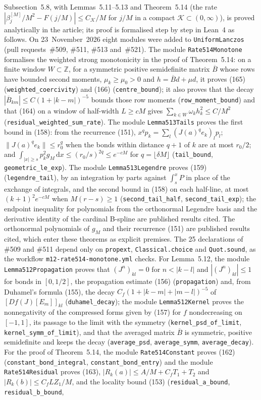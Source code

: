 \documentclass[11pt,a4paper]{article}
\newcommand{\eq}[1]{(#1)}
\begin{document}
Subsection~5.8, with Lemmas~5.11--5.13 and Theorem~5.14 (the rate $|\beta_j^{[M]}/M^2-F(j/M)|\leq C_{\mathcal K}/M$ for $j/M$ in a compact $\mathcal K\subset(0,\infty)$), is proved analytically in the article; its proof is formalised step by step in Lean~4 as follows. On 23~November~2026 eight modules were added to \texttt{UniformLanczos} (pull requests~\#509, \#511, \#513 and~\#521). The module \texttt{Rate514Monotone} formalises the weighted strong monotonicity in the proof of Theorem~5.14: on a finite window $W\subset\mathbb Z$, for a symmetric positive semidefinite matrix $\overline B$ whose rows have bounded second moments, $\mu_k\geq\mu_0>0$ and $h=\overline Bd+\mu d$, it proves \eq{165} (\texttt{weighted\_coercivity}) and \eq{166} (\texttt{centre\_bound}); it also proves that the decay $|\overline B_{km}|\leq C(1+|k-m|)^{-5}$ bounds those row moments (\texttt{row\_moment\_bound}) and that \eq{164} on a window of half-width $L\geq cM$ gives $\sum_{k\in W}\omega_kh_k^2\leq C/M^2$ (\texttt{residual\_weighted\_sum\_rate}). The module \texttt{Lemma513Tails} proves the first bound in \eq{158}: from the recurrence \eq{151}, $x^qp_k=\sum_l(J(a)^qe_k)_lp_l$; $\|J(a)^qe_k\|\leq r_0^q$ when the bonds within distance $q+1$ of $k$ are at most $r_0/2$; and $\int_{|x|\geq s}p_k^2g_M\,\mathrm dx\leq(r_0/s)^{2q}\leq e^{-cM}$ for $q=\lfloor\delta M\rfloor$ (\texttt{tail\_bound}, \texttt{geometric\_le\_exp}). The module \texttt{Lemma513Legendre} proves \eq{159} (\texttt{legendre\_tail}), by an integration by parts against $\int_s^xP$ in place of the exchange of integrals, and the second bound in \eq{158} on each half-line, at most $(k+1)^2e^{-cM}$ when $M(r-s)\geq1$ (\texttt{second\_tail\_half}, \texttt{second\_tail\_exp}); the endpoint inequality for polynomials from the orthonormal Legendre basis and the derivative identity of the cardinal B-spline are published results cited. The orthonormal polynomials of $g_M$ and their recurrence \eq{151} are published results cited, which enter these theorems as explicit premises. The 25 declarations of \#509 and \#511 depend only on \texttt{propext}, \texttt{Classical.choice} and \texttt{Quot.sound}, as the workflow \texttt{m12-rate514-monotone.yml} checks. For Lemma~5.12, the module \texttt{Lemma512Propagation} proves that $(J^n)_{kl}=0$ for $n<|k-l|$ and $|(J^n)_{kl}|\leq1$ for bonds in $[0,1/2]$, the propagation estimate \eq{156} (\texttt{propagation}) and, from Duhamel's formula \eq{155}, the decay $C_f(1+|k-m|+|m-l|)^{-5}$ of $[Df(J)[E_m]]_{kl}$ (\texttt{duhamel\_decay}); the module \texttt{Lemma512Kernel} proves the nonnegativity of the compressed forms given by \eq{157} for $f$ nondecreasing on $[-1,1]$, its passage to the limit with the symmetry (\texttt{kernel\_psd\_of\_limit}, \texttt{kernel\_symm\_of\_limit}), and that the averaged matrix $\overline B$ is symmetric, positive semidefinite and keeps the decay (\texttt{average\_psd}, \texttt{average\_symm}, \texttt{average\_decay}). For the proof of Theorem~5.14, the module \texttt{Rate514Constant} proves \eq{162} (\texttt{constant\_bond\_integral}, \texttt{constant\_bond\_entry}) and the module \texttt{Rate514Residual} proves \eq{163}, $|R_k(a)|\leq A/M+C_fT_1+T_2$ and $|R_k(b)|\leq C_fLZ_1/M$, and the locality bound \eq{153} (\texttt{residual\_a\_bound}, \texttt{residual\_b\_bound}, 
\end{document}
